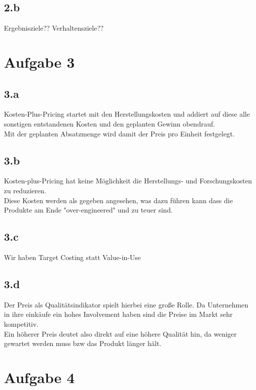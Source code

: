 \subsection{2.b}
    Ergebnisziele?? Verhaltensziele??


\section{Aufgabe 3}
\subsection{3.a}
    Kosten-Plus-Pricing startet mit den Herstellungskosten und addiert auf diese alle sonstigen entstandenen Kosten und den geplanten Gewinn obendrauf. \\
    Mit der geplanten Absatzmenge wird damit der Preis pro Einheit festgelegt.

\subsection{3.b}
    Kosten-plus-Pricing hat keine Möglichkeit die Herstellungs- und Forschungskosten zu reduzieren. \\
    Diese Kosten werden als gegeben angesehen, was dazu führen kann dass die Produkte am Ende "over-engineered" und zu teuer sind.

\subsection{3.c}
    Wir haben Target Costing statt Value-in-Use

\subsection{3.d}
    Der Preis als Qualitätsindikator spielt hierbei eine große Rolle. Da Unternehmen in ihre einkäufe ein hohes Involvement haben sind die Preise im Markt sehr kompetitiv. \\
    Ein höherer Preis deutet also direkt auf eine höhere Qualität hin, da weniger gewartet werden muss bzw das Produkt länger hält.


\section{Aufgabe 4}
